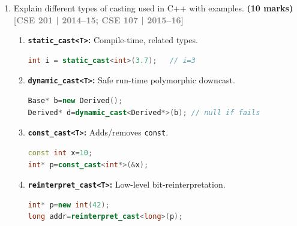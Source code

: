 \documentclass[12pt,a3paper]{article}
\newcommand{\yr}[1]{\hfill\textcolor{gray}{\small\textbf{[#1]}}}
\newcommand{\mk}[1]{\textcolor{orange!70!black}{\small\textbf{(#1 marks)}}}
\begin{document}
\begin{enumerate}
\begin{tcolorbox}[enhanced,breakable,ansbox,colback=cF!4,colframe=cF,
  boxrule=0.8pt,arc=5pt,
  title={\textbf{Answer --- Vector class for v1 += (10 + v2)}},
  fonttitle=\bfseries\color{white},colbacktitle=cF]
\begin{lstlisting}[language=C++]
class Vec {
    double x, y, z;
public:
    Vec(double a=0,double b=0,double c=0): x(a),y(b),z(c){}

    Vec& operator+=(const Vec& v){ x+=v.x; y+=v.y; z+=v.z; return *this; }

    friend Vec operator+(double n, const Vec& v){
        return Vec(v.x+n, v.y+n, v.z+n);
    }
    void print(){ cout<<"("<<x<<","<<y<<","<<z<<")\n"; }
};

int main(){
    Vec v1(1,2,3), v2(4,5,6);
    v1 += (10+v2);   // 10+v2=(14,15,16); v1+=(14,15,16)
    v1.print();      // (15,17,19)
}
\end{lstlisting}
\end{tcolorbox}


\item Explain different types of casting used in C++ with examples. \mk{10}
\yr{CSE 201 | 2014--15; CSE 107 | 2015--16}

\begin{tcolorbox}[enhanced,breakable,ansbox,colback=cF!4,colframe=cF,
  boxrule=0.8pt,arc=5pt,
  title={\textbf{Answer --- Four C++ casting types with examples}},
  fonttitle=\bfseries\color{white},colbacktitle=cF]

\begin{enumerate}[label=\textbf{\arabic*.}]
  \item \textbf{\texttt{static\_cast<T>}:} Compile-time, related
    types.
\begin{lstlisting}[language=C++]
int i = static_cast<int>(3.7);   // i=3
\end{lstlisting}

  \item \textbf{\texttt{dynamic\_cast<T>}:} Safe run-time
    polymorphic downcast.
\begin{lstlisting}[language=C++]
Base* b=new Derived();
Derived* d=dynamic_cast<Derived*>(b); // null if fails
\end{lstlisting}

  \item \textbf{\texttt{const\_cast<T>}:} Adds/removes
    \texttt{const}.
\begin{lstlisting}[language=C++]
const int x=10;
int* p=const_cast<int*>(&x);
\end{lstlisting}

  \item \textbf{\texttt{reinterpret\_cast<T>}:} Low-level
    bit-reinterpretation.
\begin{lstlisting}[language=C++]
int* p=new int(42);
long addr=reinterpret_cast<long>(p);
\end{lstlisting}
\end{enumerate}


\end{tcolorbox}
\end{enumerate}
\end{document}
